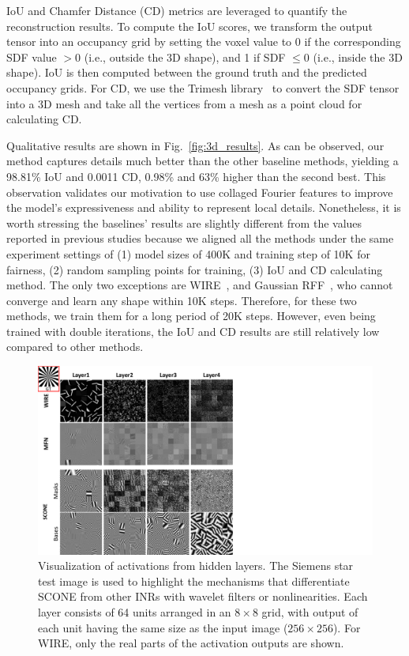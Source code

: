 \documentclass[letterpaper]{article} %
\begin{document}
IoU and Chamfer Distance (CD) metrics are leveraged to quantify the reconstruction results. To compute the IoU scores, we transform the output tensor into an occupancy grid by setting the voxel value to 0 if the corresponding SDF value $>0$ (i.e., outside the 3D shape), and 1 if SDF $ \leqslant 0$ (i.e., inside the 3D shape). IoU is then computed between the ground truth and the predicted occupancy grids. For CD, we use the Trimesh library~\cite{trimesh} to convert the SDF tensor into a 3D mesh and take all the vertices from a mesh as a point cloud for calculating CD.

Qualitative results are shown in Fig.~\ref{fig:3d_results}. As can be observed, our method captures details much better than the other baseline methods, yielding a 98.81\% IoU and 0.0011 CD, 0.98\% and 63\% higher than the second best. This observation validates our motivation to use collaged Fourier features to improve the model's expressiveness and ability to represent local details. Nonetheless, it is worth stressing the baselines' results are slightly different from the values reported in previous studies because we aligned all the methods under the same experiment settings of (1) model sizes of 400K and training step of 10K for fairness, (2) random sampling points for training, (3) IoU and CD calculating method. The only two exceptions are WIRE~\cite{saragadam2023wire}, and Gaussian RFF~\cite{tancik2020fourier}, who cannot converge and learn any shape within 10K steps. Therefore, for these two methods, we train them for a long period of 20K steps. However, even being trained with double iterations, the IoU and CD results are still relatively low compared to other methods.

\begin{figure}[!ht]
    \centering
    \includegraphics[width=0.95\columnwidth]{Figures/activations.pdf}
    \caption{Visualization of activations from hidden layers. The Siemens star test image is used to highlight the mechanisms that differentiate SCONE from other INRs with wavelet filters or nonlinearities. Each layer consists of 64 units arranged in an $8\times8$ grid, with output of each unit having the same size as the input image ($256\times256$). For WIRE, only the real parts of the activation outputs are shown.}
    \label{fig:activations}
\end{figure}
\end{document}
